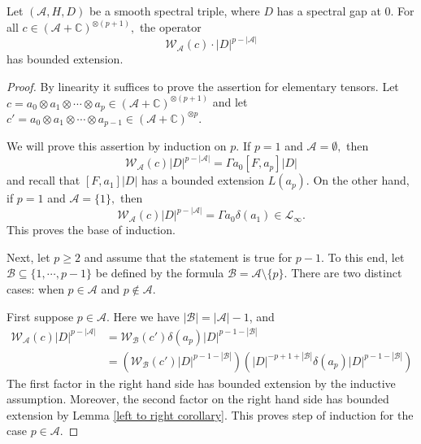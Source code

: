     \begin{lem}\label{w bounded lemma} 
        Let $(\mathcal{A},H,D)$ be a smooth spectral triple, where $D$ has a spectral gap at $0$. For all $c\in(\mathcal{A}+\mathbb{C})^{\otimes (p+1)},$ the operator
        $$\mathcal{W}_{\mathscr{A}}(c)\cdot |D|^{p-|\mathscr{A}|}$$
        has bounded extension.
    \end{lem}
    \begin{proof} 
        By linearity it suffices to prove the assertion for elementary tensors. Let $c = a_0\otimes a_1\otimes\cdots\otimes a_p\in(\mathcal{A}+\mathbb{C})^{\otimes (p+1)}$ 
        and let $c'=a_0\otimes a_1\otimes\cdots\otimes a_{p-1}\in(\mathcal{A}+\mathbb{C})^{\otimes p}.$

        We will prove this assertion by induction on $p.$ If $p=1$ and $\mathscr{A}=\emptyset,$ then
        $$\mathcal{W}_{\mathscr{A}}(c)|D|^{p-|\mathscr{A}|}=\Gamma a_0[F,a_p]|D|$$
        and recall that $[F,a_1]|D|$ has a bounded extension $L(a_p)$.
        On the other hand, if $p=1$ and $\mathscr{A}=\{1\},$ then
        $$\mathcal{W}_{\mathscr{A}}(c)|D|^{p-|\mathscr{A}|}=\Gamma a_0\delta(a_1)\in\mathcal{L}_{\infty}.$$
        This proves the base of induction. 
        
        Next, let $p \geq 2$ and assume that the statement is true for $p-1$. To this end, 
        let $\mathscr{B}\subseteq\{1,\cdots,p-1\}$ be defined by the formula $\mathscr{B}=\mathscr{A}\setminus\{p\}.$ There are two distinct cases: when $p \in \mathscr{A}$ and $p \notin \mathscr{A}$.

        First suppose $p\in\mathscr{A}.$ Here we have $|\mathscr{B}| = |\mathscr{A}|-1$, and
        \begin{align*}
            \mathcal{W}_{\mathscr{A}}(c)|D|^{p-|\mathscr{A}|} &= \mathcal{W}_{\mathscr{B}}(c')\delta(a_p)|D|^{p-1-|\mathscr{B}|}\\
                                      &= \left(\mathcal{W}_{\mathscr{B}}(c')|D|^{p-1-|\mathscr{B}|}\right)\left(|D|^{-p+1+|\mathscr{B}|}\delta(a_p)|D|^{p-1-|\mathscr{B}|}\right)
        \end{align*}
        The first factor in the right hand side has bounded extension by the inductive assumption. Moreover, the second factor on the right hand side has bounded extension by Lemma \ref{left to right corollary}. This proves step of induction for the case $p\in\mathscr{A}.$
        

\end{proof}
